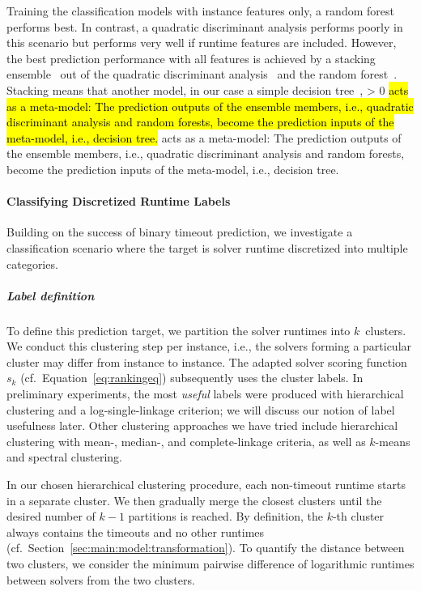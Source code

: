 \documentclass[sn-basic, Numbered]{sn-jnl} %
\newcommand{\showchanges}{1} %
\newcommand{\change}[1]{\ifnum \showchanges > 0 \sethlcolor{yellow}\hl{#1} \else #1 \fi}
\begin{document}
Training the classification models with instance features only, a random forest performs best.
In contrast, a quadratic discriminant analysis performs poorly in this scenario but performs very well if runtime features are included.
However, the best prediction performance with all features is achieved by a stacking ensemble~\cite{wolpert1992stacked} out of the quadratic discriminant analysis~\cite{tharwat2016linear} and the random forest~\cite{breiman2001random}.
Stacking means that another model, in our case a simple decision tree~\cite{breiman1984classification}, \change{acts as a meta-model:
The prediction outputs of the ensemble members, i.e., quadratic discriminant analysis and random forests, become the prediction inputs of the meta-model, i.e., decision tree.
}

\paragraph{Classifying Discretized Runtime Labels}

Building on the success of binary timeout prediction, we investigate a classification scenario where the target is solver runtime discretized into multiple categories.

\subparagraph{Label definition}

To define this prediction target, we partition the solver runtimes into $k$~clusters.
We conduct this clustering step per instance, i.e., the solvers forming a particular cluster may differ from instance to instance.
The adapted solver scoring function~$s_k$ (cf.~Equation~\eqref{eq:rankingeq}) subsequently uses the cluster labels.
In preliminary experiments, the most \emph{useful} labels were produced with hierarchical clustering and a log-single-linkage criterion; we will discuss our notion of label usefulness later.
Other clustering approaches we have tried include hierarchical clustering with mean-, median-, and complete-linkage criteria, as well as $k$-means and spectral clustering.

In our chosen hierarchical clustering procedure, each non-timeout runtime starts in a separate cluster.
We then gradually merge the closest clusters until the desired number of $k-1$ partitions is reached.
By definition, the $k$-th cluster always contains the timeouts and no other runtimes (cf.~Section~\ref{sec:main:model:transformation}).
To quantify the distance between two clusters, we consider the minimum pairwise difference of logarithmic runtimes between solvers from the two clusters.
\end{document}
